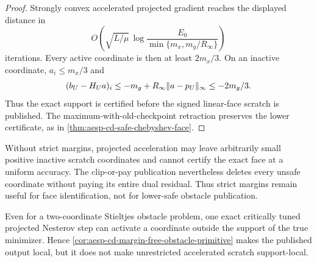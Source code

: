 \begin{proof}
Strongly convex accelerated projected gradient reaches the displayed distance
in
\begin{equation*}
 O\!\left(\sqrt{L/\mu}\,
 \log\!\frac{E_0}{\min\{m_x,m_g/R_\infty\}}\right)
\end{equation*}
iterations.  Every
active coordinate is then at least $2m_x/3$.  On an inactive coordinate,
$a_i\leq m_x/3$ and
\begin{equation*}
 (b_U-H_Ua)_i
 \leq-m_g+R_\infty\lVert a-p_U\rVert_\infty\leq-2m_g/3.
\end{equation*}
Thus the exact support is certified before the signed linear-face scratch is
published.  The maximum-with-old-checkpoint retraction preserves the lower
certificate, as in \cref{thm:aesp-cd-safe-chebyshev-face}.
\end{proof}

Without strict margins, projected acceleration may leave arbitrarily small
positive inactive scratch coordinates and cannot certify the exact face at a
uniform accuracy.  The clip-or-pay publication nevertheless deletes every
unsafe coordinate without paying its entire dual residual.  Thus strict
margins remain useful for face identification, not for lower-safe obstacle
publication.

\begin{proposition}
\label{prop:aesp-cd-accelerated-support-spill}
Even for a two-coordinate Stieltjes obstacle problem, one exact critically
tuned projected Nesterov step can activate a coordinate outside the support of
the true minimizer.  Hence
\cref{cor:aesp-cd-margin-free-obstacle-primitive} makes the published output
local, but it does not make unrestricted accelerated scratch support-local.
\end{proposition}


